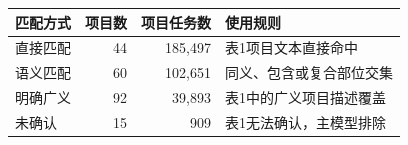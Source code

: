 \begin{tabularx}{\textwidth}{lrrX}
\toprule
匹配方式 & 项目数 & 项目任务数 & 使用规则 \\
\midrule
直接匹配 & 44 & 185,497 & 表1项目文本直接命中 \\
语义匹配 & 60 & 102,651 & 同义、包含或复合部位交集 \\
明确广义 & 92 & 39,893 & 表1中的广义项目描述覆盖 \\
未确认 & 15 & 909 & 表1无法确认，主模型排除 \\
\bottomrule
\end{tabularx}
